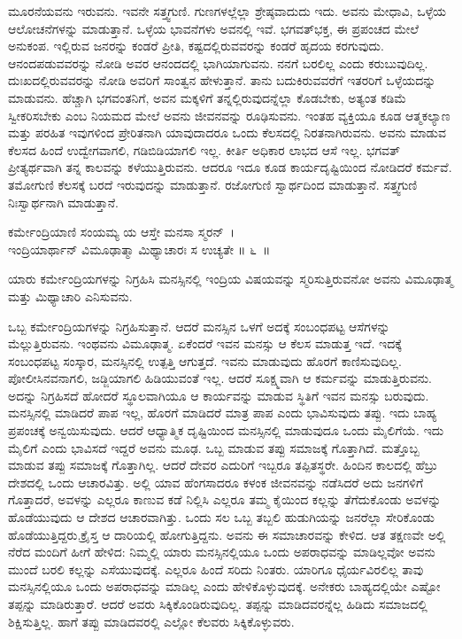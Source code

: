 ಮೂರನೆಯವನು ಇರುವನು. ಇವನೇ ಸತ್ತ್ವಗುಣಿ. ಗುಣಗಳಲ್ಲೆಲ್ಲಾ ಶ್ರೇಷ್ಠವಾದುದು ಇದು. ಅವನು ಮೇಧಾವಿ, ಒಳ್ಳೆಯ ಆಲೋಚನೆಗಳನ್ನು ಮಾಡುತ್ತಾನೆ. ಒಳ್ಳೆಯ ಭಾವನೆಗಳು ಅವನಲ್ಲಿ ಇವೆ. ಭಗವತ್​ಭಕ್ತ, ಈ ಪ್ರಪಂಚದ ಮೇಲೆ ಅನುಕಂಪ. ಇಲ್ಲಿರುವ ಜನರನ್ನು ಕಂಡರೆ ಪ್ರೀತಿ, ಕಷ್ಟದಲ್ಲಿರುವವರನ್ನು ಕಂಡರೆ ಹೃದಯ ಕರಗುವುದು. ಆನಂದಪಡುವವರನ್ನು ನೋಡಿ ಅವರ ಆನಂದದಲ್ಲಿ ಭಾಗಿಯಾಗುವನು. ನನಗೆ ಬರಲಿಲ್ಲ ಎಂದು ಕರುಬುವುದಿಲ್ಲ. ದುಃಖದಲ್ಲಿರುವವರನ್ನು ನೋಡಿ ಅವರಿಗೆ ಸಾಂತ್ವನ ಹೇಳುತ್ತಾನೆ. ತಾನು ಬದುಕಿರುವವರೆಗೆ ಇತರರಿಗೆ ಒಳ್ಳೆಯದನ್ನು ಮಾಡುವನು. ಹೆಚ್ಚಾಗಿ ಭಗವಂತನಿಗೆ, ಅವನ ಮಕ್ಕಳಿಗೆ ತನ್ನಲ್ಲಿರುವುದನ್ನೆಲ್ಲಾ ಕೊಡಬೇಕು, ಅತ್ಯಂತ ಕಡಿಮೆ ಸ್ವೀಕರಿಸಬೇಕು ಎಂಬ ನಿಯಮದ ಮೇಲೆ ಅವನು ಜೀವನವನ್ನು ರೂಢಿಸುವನು. ಇಂತಹ ವ್ಯಕ್ತಿಯೂ ಕೂಡ ಆತ್ಮಕಲ್ಯಾಣ ಮತ್ತು ಪರಹಿತ ಇವುಗಳಿಂದ ಪ್ರೇರಿತನಾಗಿ ಯಾವುದಾದರೂ ಒಂದು ಕೆಲಸದಲ್ಲಿ ನಿರತನಾಗಿರುವನು. ಅವನು ಮಾಡುವ ಕೆಲಸದ ಹಿಂದೆ ಉದ್ವೇಗವಾಗಲಿ, ಗಡಿಬಿಡಿಯಾಗಲಿ ಇಲ್ಲ. ಕೀರ್ತಿ ಅಧಿಕಾರ ಲಾಭದ ಆಸೆ ಇಲ್ಲ. ಭಗವತ್ ಪ್ರೀತ್ಯರ್ಥವಾಗಿ ತನ್ನ ಕಾಲವನ್ನು ಕಳೆಯುತ್ತಿರುವನು. ಆದರೂ ಇದೂ ಕೂಡ ಕಾರ್ಯದೃಷ್ಟಿಯಿಂದ ನೋಡಿದರೆ ಕರ್ಮವೆ. ತಮೋಗುಣಿ ಕೆಲಸಕ್ಕೆ ಬರದೆ ಇರುವುದನ್ನು ಮಾಡುತ್ತಾನೆ. ರಜೋಗುಣಿ ಸ್ವಾರ್ಥದಿಂದ ಮಾಡುತ್ತಾನೆ. ಸತ್ತ್ವಗುಣಿ ನಿಃಸ್ವಾರ್ಥನಾಗಿ ಮಾಡುತ್ತಾನೆ.

\begin{shloka}
ಕರ್ಮೇಂದ್ರಿಯಾಣಿ ಸಂಯಮ್ಯ ಯ ಆಸ್ತೇ ಮನಸಾ ಸ್ಮರನ್~।\\ಇಂದ್ರಿಯಾರ್ಥಾನ್ ವಿಮೂಢಾತ್ಮಾ ಮಿಥ್ಯಾಚಾರಃ ಸ ಉಚ್ಯತೇ \hfill॥ ೬~॥
\end{shloka}

\begin{artha}
ಯಾರು ಕರ್ಮೇಂದ್ರಿಯಗಳನ್ನು ನಿಗ್ರಹಿಸಿ ಮನಸ್ಸಿನಲ್ಲಿ ಇಂದ್ರಿಯ ವಿಷಯವನ್ನು ಸ್ಮರಿಸುತ್ತಿರುವನೋ ಅವನು ವಿಮೂಢಾತ್ಮ ಮತ್ತು ಮಿಥ್ಯಾಚಾರಿ ಎನಿಸುವನು.
\end{artha}

ಒಬ್ಬ ಕರ್ಮೇಂದ್ರಿಯಗಳನ್ನು ನಿಗ್ರಹಿಸುತ್ತಾನೆ. ಆದರೆ ಮನಸ್ಸಿನ ಒಳಗೆ ಅದಕ್ಕೆ ಸಂಬಂಧಪಟ್ಟ ಆಸೆಗಳನ್ನು ಮೆಲ್ಲುತ್ತಿರುವನು. ಇಂಥವನು ವಿಮೂಢಾತ್ಮ. ಏಕೆಂದರೆ ಇವನ ಮನಸ್ಸು ಆ ಕೆಲಸ ಮಾಡುತ್ತ ಇದೆ. ಇದಕ್ಕೆ ಸಂಬಂಧಪಟ್ಟ ಸಂಸ್ಕಾರ, ಮನಸ್ಸಿನಲ್ಲಿ ಉತ್ಪತ್ತಿ ಆಗುತ್ತದೆ. ಇವನು ಮಾಡುವುದು ಹೊರಗೆ ಕಾಣಿಸುವುದಿಲ್ಲ. ಪೋಲೀಸಿನವನಾಗಲಿ, ಜಡ್ಜಿಯಾಗಲಿ ಹಿಡಿಯುವಂತೆ ಇಲ್ಲ. ಆದರೆ ಸೂಕ್ಷ್ಮವಾಗಿ ಆ ಕರ್ಮವನ್ನು ಮಾಡುತ್ತಿರುವನು. ಅದನ್ನು ನಿಗ್ರಹಿಸದೆ ಹೋದರೆ ಸ್ಥೂಲವಾಗಿಯೂ ಆ ಕಾರ್ಯವನ್ನು ಮಾಡುವ ಸ್ಥಿತಿಗೆ ಇವನ ಮನಸ್ಸು ಬರುವುದು. ಮನಸ್ಸಿನಲ್ಲಿ ಮಾಡಿದರೆ ಪಾಪ ಇಲ್ಲ, ಹೊರಗೆ ಮಾಡಿದರೆ ಮಾತ್ರ ಪಾಪ ಎಂದು ಭಾವಿಸುವುದು ತಪ್ಪು. ಇದು ಬಾಹ್ಯ ಪ್ರಪಂಚಕ್ಕೆ ಅನ್ವಯಿಸುವುದು. ಆದರೆ ಆಧ್ಯಾತ್ಮಿಕ ದೃಷ್ಟಿಯಿಂದ ಮನಸ್ಸಿನಲ್ಲಿ ಮಾಡುವುದೂ ಒಂದು ಮೈಲಿಗೆಯೆ. ಇದು ಮೈಲಿಗೆ ಎಂದು ಭಾವಿಸದೆ ಇದ್ದರೆ ಅವನು ಮೂಢ. ಒಬ್ಬ ಮಾಡುವ ತಪ್ಪು ಸಮಾಜಕ್ಕೆ ಗೊತ್ತಾಗಿದೆ. ಮತ್ತೊಬ್ಬ ಮಾಡುವ ತಪ್ಪು ಸಮಾಜಕ್ಕೆ ಗೊತ್ತಾಗಿಲ್ಲ. ಆದರೆ ದೇವರ ಎದುರಿಗೆ ಇಬ್ಬರೂ ತಪ್ಪಿತಸ್ಥರೇ. ಹಿಂದಿನ ಕಾಲದಲ್ಲಿ ಹೆಬ್ರು ದೇಶದಲ್ಲಿ ಒಂದು ಆಚಾರವಿತ್ತು. ಅಲ್ಲಿ ಯಾವ ಹೆಂಗಸಾದರೂ ಕಳಂಕ ಜೀವನವನ್ನು ನಡೆಸಿದರೆ ಅದು ಜನಗಳಿಗೆ ಗೊತ್ತಾದರೆ, ಅವಳನ್ನು ಎಲ್ಲರೂ ಕಾಣುವ ಕಡೆ ನಿಲ್ಲಿಸಿ ಎಲ್ಲರೂ ತಮ್ಮ ಕೈಯಿಂದ ಕಲ್ಲನ್ನು ತೆಗೆದುಕೊಂಡು ಅವಳನ್ನು ಹೊಡೆಯುವುದು ಆ ದೇಶದ ಆಚಾರವಾಗಿತ್ತು. ಒಂದು ಸಲ ಒಬ್ಬ ತಬ್ಬಲಿ ಹುಡುಗಿಯನ್ನು ಜನರೆಲ್ಲಾ ಸೇರಿಕೊಂಡು ಹೊಡೆಯುತ್ತಿದ್ದರು.ಕ್ರೈಸ್ತ ಆ ದಾರಿಯಲ್ಲಿ ಹೋಗುತ್ತಿದ್ದನು. ಅವನು ಈ ಸಮಾಚಾರವನ್ನು ಕೇಳಿದ. ಆತ ತಕ್ಷಣವೇ ಅಲ್ಲಿ ನೆರೆದ ಮಂದಿಗೆ ಹೀಗೆ ಹೇಳಿದ: ನಿಮ್ಮಲ್ಲಿ ಯಾರು ಮನಸ್ಸಿನಲ್ಲಿಯೂ ಒಂದು ಅಪರಾಧವನ್ನು ಮಾಡಿಲ್ಲವೋ ಅವನು ಮುಂದೆ ಬರಲಿ ಕಲ್ಲನ್ನು ಎಸೆಯುವುದಕ್ಕೆ. ಎಲ್ಲರೂ ಹಿಂದೆ ಸರಿದು ನಿಂತರು. ಯಾರಿಗೂ ಧೈರ್ಯವಿರಲಿಲ್ಲ ತಾವು ಮನಸ್ಸಿನಲ್ಲಿಯೂ ಒಂದು ಅಪರಾಧವನ್ನು ಮಾಡಿಲ್ಲ ಎಂದು ಹೇಳಿಕೊಳ್ಳುವುದಕ್ಕೆ. ಅನೇಕರು ಬಾಹ್ಯದಲ್ಲಿಯೇ ಎಷ್ಟೋ ತಪ್ಪನ್ನು ಮಾಡಿರುತ್ತಾರೆ. ಆದರೆ ಅವರು ಸಿಕ್ಕಿಕೊಂಡಿರುವುದಿಲ್ಲ. ತಪ್ಪನ್ನು ಮಾಡಿದವರನ್ನೆಲ್ಲ ಹಿಡಿದು ಸಮಾಜದಲ್ಲಿ ಶಿಕ್ಷಿಸುತ್ತಿಲ್ಲ. ಹಾಗೆ ತಪ್ಪು ಮಾಡಿದವರಲ್ಲಿ ಎಲ್ಲೋ ಕೆಲವರು ಸಿಕ್ಕಿಕೊಳ್ಳುವರು.

